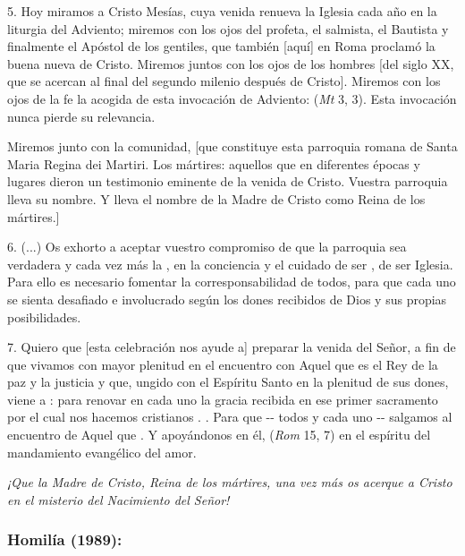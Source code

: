 \begin{body}
\begin{body}
		5. Hoy miramos a Cristo Mesías, cuya venida renueva la Iglesia cada año en la liturgia del Adviento; miremos con los ojos del profeta, el salmista, el Bautista y finalmente el Apóstol de los gentiles, que también {[}aquí{]} en Roma proclamó la buena nueva de Cristo. Miremos juntos con los ojos de los hombres {[}del siglo XX, que se acercan al final del segundo milenio después de Cristo{]}. Miremos con los ojos de la fe la acogida de esta invocación de Adviento:  (\emph{Mt} 3, 3). Esta invocación nunca pierde su relevancia.
		
		Miremos junto con la comunidad, {[}que constituye esta parroquia romana de Santa Maria Regina dei Martiri. Los mártires: aquellos que en diferentes épocas y lugares dieron un testimonio eminente de la venida de Cristo. Vuestra parroquia lleva su nombre. Y lleva el nombre de la Madre de Cristo como Reina de los mártires.{]}
		
		6. (...) Os exhorto a aceptar vuestro compromiso de que la parroquia sea verdadera y cada vez más la , en la conciencia y el cuidado de ser , de ser Iglesia. Para ello es necesario fomentar la corresponsabilidad de todos, para que cada uno se sienta desafiado e involucrado según los dones recibidos de Dios y sus propias posibilidades.
		
		7.  Quiero que {[}esta celebración nos ayude a{]} preparar la venida del Señor, a fin de que vivamos con mayor plenitud en el encuentro con Aquel que es el Rey de la paz y la justicia y que, ungido con el Espíritu Santo en la plenitud de sus dones, viene a : para renovar en cada uno la gracia recibida en ese primer sacramento por el cual nos hacemos cristianos . . Para que -\/- todos y cada uno -\/- salgamos al encuentro de Aquel que . Y apoyándonos en él,  (\emph{Rom} 15, 7) en el espíritu del mandamiento evangélico del amor.
		
		\emph{¡Que la Madre de Cristo, Reina de los mártires, una vez más os acerque a Cristo en el misterio del Nacimiento del Señor!}
	\end{body}
	
	\subsubsection{Homilía (1989): }
	

\end{body}
